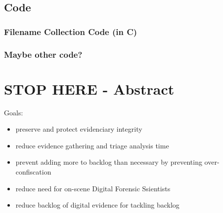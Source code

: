 \documentclass[12pt]{article}
\begin{document}
\newpage
\subsection{Code}
\subsubsection{Filename Collection Code (in C)}


\subsubsection{Maybe other code?}


\newpage










































\newpage

\section{STOP HERE - Abstract}
\label{sect-abstract}

Goals:
\begin{itemize}
  \item preserve and protect evidenciary integrity
  \item reduce evidence gathering and triage analysis time
  \item prevent adding more to backlog than necessary by preventing over-confiscation
  \item reduce need for on-scene Digital Forensic Ssientists
  \item reduce backlog of digital evidence for tackling backlog
\end{itemize}
\end{document}
